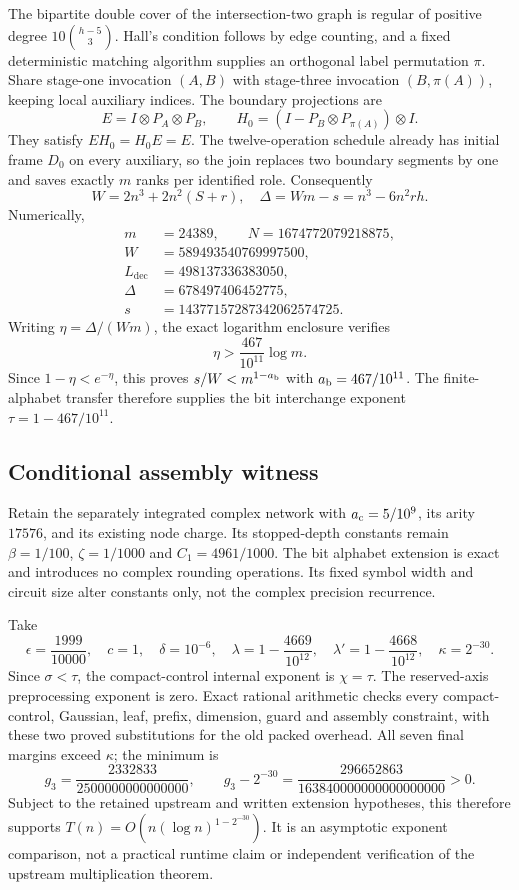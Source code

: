 The bipartite double cover of the intersection-two graph is regular of
positive degree $10\binom{h-5}3$. Hall's condition follows by edge
counting, and a fixed deterministic matching algorithm supplies an
orthogonal label permutation $\pi$. Share stage-one invocation $(A,B)$
with stage-three invocation $(B,\pi(A))$, keeping local auxiliary indices.
The boundary projections are
\[
 E=I\otimes P_A\otimes P_B,\qquad
 H_0=(I-P_B\otimes P_{\pi(A)})\otimes I.
\]
They satisfy $EH_0=H_0E=E$. The twelve-operation schedule already has
initial frame $D_0$ on every auxiliary, so the join replaces two boundary
segments by one and saves exactly $m$ ranks per identified role.
Consequently
\[
 W=2n^3+2n^2(S+r),\quad
 \Delta=Wm-s=n^3-6n^2rh.
\]
Numerically,
\[
\begin{split}
 m&=24389,\qquad N=1674772079218875,\\
 W&=589493540769997500,\\
 L_{\mathrm{dec}}&=498137336383050,\\
 \Delta&=678497406452775,\\
 s&=14377157287342062574725.
\end{split}
\]
Writing $\eta=\Delta/(Wm)$, the exact logarithm enclosure verifies
\[
 \eta>\frac{467}{10^{11}}\log m.
\]
Since $1-\eta<e^{-\eta}$, this proves
$s/W<m^{1-a_{\rm b}}$ with $a_{\rm b}=467/10^{11}$.
The finite-alphabet transfer therefore supplies the bit interchange
exponent $\tau=1-467/10^{11}$.

\subsection{Conditional assembly witness}
Retain the separately integrated complex network with
$a_{\rm c}=5/10^9$, its arity $17576$, and its existing node charge.
Its stopped-depth constants remain $\beta=1/100$, $\zeta=1/1000$ and
$C_1=4961/1000$. The bit alphabet extension is exact and introduces no
complex rounding operations. Its fixed symbol width and circuit size
alter constants only, not the complex precision recurrence.

Take
\[
 \epsilon=\frac{1999}{10000},\quad c=1,\quad\delta=10^{-6},\quad
 \lambda=1-\frac{4669}{10^{12}},\quad
 \lambda'=1-\frac{4668}{10^{12}},\quad\kappa=2^{-30}.
\]
Since $\sigma<\tau$, the compact-control internal exponent is
$\chi=\tau$. The reserved-axis preprocessing exponent is zero. Exact
rational arithmetic checks every compact-control, Gaussian, leaf,
prefix, dimension, guard and assembly constraint, with these two proved
substitutions for the old packed overhead. All seven final margins exceed
$\kappa$; the minimum is
\[
 g_3=\frac{2332833}{2500000000000000},\qquad
 g_3-2^{-30}=\frac{296652863}{163840000000000000000}>0.
\]
Subject to the retained upstream and written extension hypotheses, this
therefore supports $T(n)=O(n(\log n)^{1-2^{-30}})$. It is an asymptotic
exponent comparison, not a practical runtime claim or independent
verification of the upstream multiplication theorem.
